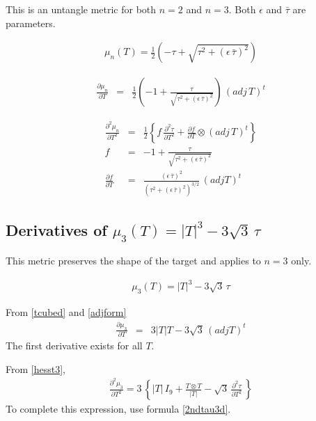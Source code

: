 \documentclass{report}
\begin{document}
\noindent This is an untangle metric for both $n=2$ and $n=3$. Both 
$\epsilon$ and $\bar{\tau}$ are parameters. \newline

\begin{eqnarray} 
\mu_n(T) = \frac{1}{2} \left( - \tau + \sqrt{\tau^2 + \left(\epsilon \, \bar{\tau} \right)^2} \right)
\end{eqnarray}

\begin{eqnarray}
\frac{\partial \mu_n}{\partial T} & = & \frac{1}{2} \left( -1 + \frac{\tau}{\sqrt{\tau^2 + \left(\epsilon \, \bar{\tau} \right)^2}} \right) \, (adj \, T)^t 
\end{eqnarray}

\begin{eqnarray}
\frac{\partial^2 \mu_n}{\partial T^2} & = & \frac{1}{2} \left\{ f \, \frac{\partial^2 \tau}{\partial T^2} + \frac{\partial f}{\partial T} \otimes (adj \, T)^t \right\} \\
f & = & -1 +  \frac{\tau}{\sqrt{\tau^2 + \left(\epsilon \, \bar{\tau} \right)^2}} \\
\frac{\partial f}{\partial T} & = & \frac{(\epsilon \, \bar{\tau})^2}{\left(\tau^2 + \left(\epsilon \, \bar{\tau} \right)^2 \right)^{3/2}} \, (adj T)^t
\end{eqnarray}


\subsection{Derivatives of $\mu_3(T) = |T|^3 - 3 \sqrt{3} \, \tau$ \label{shape3d}}

\noindent This metric preserves the shape of the target and applies 
to $n=3$ only. \newline

\begin{eqnarray}
\mu_3 (T) = |T|^3 - 3 \sqrt{3} \, \tau
\end{eqnarray}

\noindent From \ref{tcubed} and \ref{adjform}
\begin{eqnarray}
\frac{\partial \mu_3}{\partial T} & = & 3 |T| T - 3 \sqrt{3} \, (adj T)^t
\end{eqnarray}
The first derivative exists for all $T$. \newline

\noindent From \ref{hesst3},
\begin{eqnarray}
\frac{\partial^2 \mu_3}{\partial T^2} = 3 \, \left\{ |T| \, I_9 + \frac{T \otimes T}{|T|} - \sqrt{3} \, \frac{\partial^2 \tau}{\partial T^2} \, \right\}
\end{eqnarray}
To complete this expression, use formula \ref{2ndtau3d}. \newline
\end{document}
